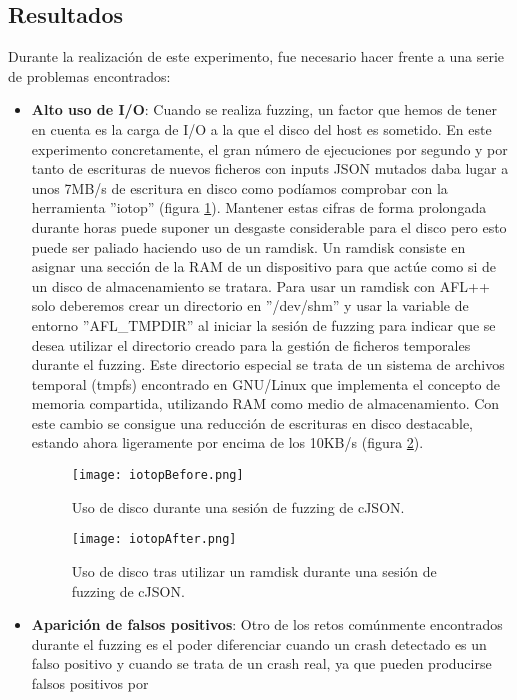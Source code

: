 \subsection{Resultados}
Durante la realización de este experimento, fue necesario hacer frente a una serie de problemas encontrados:
\begin{itemize}
    \item \textbf{Alto uso de I/O}: Cuando se realiza fuzzing, un factor que hemos de tener en cuenta es la carga 
    de I/O a la que el disco del host es sometido. En este experimento concretamente, el gran número de ejecuciones por 
    segundo y por tanto de escrituras de nuevos ficheros con inputs JSON mutados daba lugar a unos 7MB/s de escritura en 
    disco como podíamos comprobar con la herramienta ''iotop'' (figura \ref{fig:iotopBefore}). Mantener estas cifras de forma 
    prolongada durante horas puede suponer un desgaste considerable para el disco pero esto puede ser paliado haciendo uso 
    de un ramdisk. Un ramdisk consiste en asignar una sección de la RAM de un dispositivo para que actúe como si de un disco
    de almacenamiento se tratara. Para usar un ramdisk con AFL++ solo deberemos crear un directorio en ''/dev/shm'' y usar la 
    variable de entorno ''AFL\_TMPDIR'' al iniciar la sesión de fuzzing para indicar que se desea utilizar el directorio creado para 
    la gestión de ficheros temporales durante el fuzzing. Este directorio especial se trata de un sistema de archivos temporal (tmpfs)
    encontrado en GNU/Linux que implementa el concepto de memoria compartida, utilizando RAM como medio de almacenamiento. Con este 
    cambio se consigue una reducción de escrituras en disco destacable, estando ahora ligeramente por encima de los 10KB/s 
    (figura \ref{fig:iotopAfter}).
    \begin{figure}[H]
        \centering
        \texttt{[image: iotopBefore.png]}
        \caption{Uso de disco durante una sesión de fuzzing de cJSON.}
        \label{fig:iotopBefore}
    \end{figure}
    \begin{figure}[H]
        \centering
        \texttt{[image: iotopAfter.png]}
        \caption{Uso de disco tras utilizar un ramdisk durante una sesión de fuzzing de cJSON.}
        \label{fig:iotopAfter}
    \end{figure}
    \item \textbf{Aparición de falsos positivos}: Otro de los retos comúnmente encontrados durante el fuzzing es el poder diferenciar 
    cuando un crash detectado es un falso positivo y cuando se trata de un crash real, ya que pueden producirse falsos positivos por

\end{itemize}
